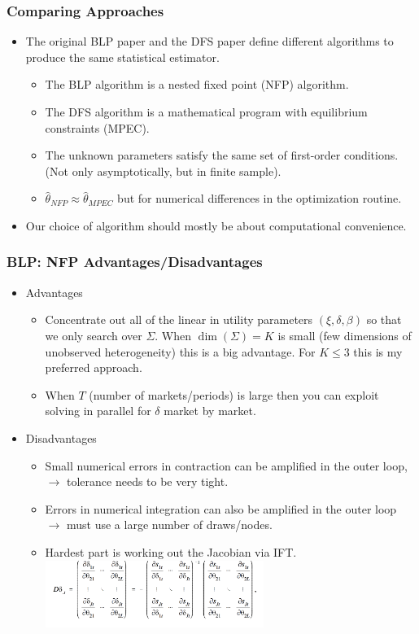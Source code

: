 \documentclass[xcolor=pdftex,dvipsnames,table,mathserif]{beamer}
\begin{document}
\begin{frame}
\frametitle{Comparing Approaches}
\begin{itemize}
\item The original BLP paper and the DFS paper define different \alert{algorithms} to produce the same statistical \alert{estimator}.
\begin{itemize}
\item The BLP algorithm is a \alert{nested fixed point} (NFP) algorithm. 
\item The DFS algorithm is a \alert{mathematical program with equilibrium constraints} (MPEC).
\item The unknown parameters satisfy the same set of first-order conditions. (Not only asymptotically, but in finite sample).
\item $\hat{\theta}_{NFP} \approx \hat{\theta}_{MPEC}$ but for numerical differences in the optimization routine.
\end{itemize}
\item Our choice of algorithm should mostly be about computational convenience.
\end{itemize}
\end{frame}

\begin{frame}
\frametitle{BLP: NFP Advantages/Disadvantages}
\begin{itemize}
\item Advantages
\begin{itemize}
\item Concentrate out all of the linear in utility parameters $(\xi,\delta,\beta)$ so that we only search over $\Sigma$. When $\dim(\Sigma)=K$ is small (few dimensions of unobserved heterogeneity) this is a big advantage. For $K \leq 3$ this is my preferred approach.
\item When $T$ (number of markets/periods) is large then you can exploit solving in parallel for $\delta$ market by market.
\end{itemize}
\item Disadvantages
\begin{itemize}
\item Small numerical errors in contraction can be amplified in the outer loop, $\rightarrow$ tolerance needs to be very tight.
\item Errors in numerical integration can also be amplified in the outer loop $\rightarrow$ must use a large number of draws/nodes.
\item Hardest part is working out the Jacobian via IFT.
\includegraphics[width=2.8in]{resources/implicit_function.png}\\
\end{itemize}
\end{itemize}
\end{frame}
\end{document}
